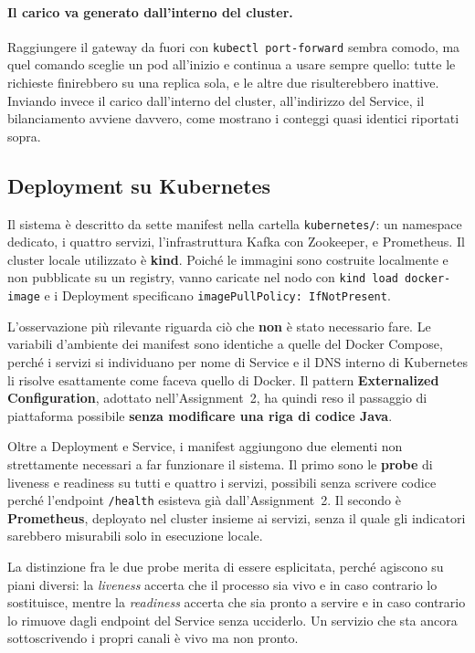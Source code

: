 \documentclass[12pt,a4paper]{article}
\begin{document}
\paragraph{Il carico va generato dall'interno del cluster.} Raggiungere il gateway da fuori con
\texttt{kubectl port-forward} sembra comodo, ma quel comando sceglie un pod all'inizio e continua a
usare sempre quello: tutte le richieste finirebbero su una replica sola, e le altre due
risulterebbero inattive. Inviando invece il carico dall'interno del cluster, all'indirizzo del
Service, il bilanciamento avviene davvero, come mostrano i conteggi quasi identici riportati
sopra.

\subsection{Deployment su Kubernetes}

Il sistema \`e descritto da sette manifest nella cartella \texttt{kubernetes/}: un namespace
dedicato, i quattro servizi, l'infrastruttura Kafka con Zookeeper, e Prometheus. Il cluster locale
utilizzato \`e \textbf{kind}. Poich\'e le immagini sono costruite localmente e non pubblicate su un
registry, vanno caricate nel nodo con \texttt{kind load docker-image} e i Deployment specificano
\texttt{imagePullPolicy: IfNotPresent}.

L'osservazione pi\`u rilevante riguarda ci\`o che \textbf{non} \`e stato necessario fare. Le
variabili d'ambiente dei manifest sono identiche a quelle del Docker Compose, perch\'e i servizi si
individuano per nome di Service e il DNS interno di Kubernetes li risolve esattamente come faceva
quello di Docker. Il pattern \textbf{Externalized Configuration}, adottato nell'Assignment~2, ha
quindi reso il passaggio di piattaforma possibile \textbf{senza modificare una riga di codice Java}.

Oltre a Deployment e Service, i manifest aggiungono due elementi non strettamente necessari a far
funzionare il sistema. Il primo sono le \textbf{probe} di liveness e readiness su tutti e quattro i
servizi, possibili senza scrivere codice perch\'e l'endpoint \texttt{/health} esisteva gi\`a
dall'Assignment~2. Il secondo \`e \textbf{Prometheus}, deployato nel cluster insieme ai servizi,
senza il quale gli indicatori sarebbero misurabili solo in esecuzione locale.

La distinzione fra le due probe merita di essere esplicitata, perch\'e agiscono su piani diversi: la
\emph{liveness} accerta che il processo sia vivo e in caso contrario lo sostituisce, mentre la
\emph{readiness} accerta che sia pronto a servire e in caso contrario lo rimuove dagli endpoint del
Service senza ucciderlo. Un servizio che sta ancora sottoscrivendo i propri canali \`e vivo ma non
pronto.
\end{document}
